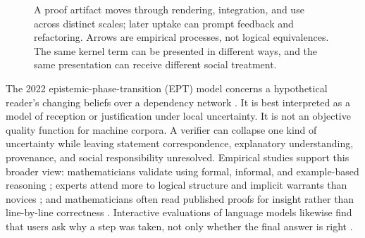 \documentclass[11pt]{article}
\newcommand{\code}[1]{\texttt{#1}}
\begin{document}
\begin{figure}[ht]
\centering
{}
\caption{A proof artifact moves through rendering, integration, and use across distinct scales;
later uptake can prompt feedback and refactoring.  Arrows are empirical processes, not logical
equivalences.  The same kernel term can be presented in different ways, and the same presentation
can receive different social treatment.}
\label{fig:scales}
\end{figure}

The 2022 epistemic-phase-transition (EPT) model concerns a hypothetical reader's changing beliefs
over a dependency network \citep{viteri2022}.  It is best interpreted as a model of reception or
justification under local uncertainty.  It is not an objective quality function for machine
corpora.  A verifier can collapse one kind of uncertainty while leaving statement correspondence,
explanatory understanding, provenance, and social responsibility unresolved.  Empirical studies
support this broader view: mathematicians validate using formal, informal, and example-based
reasoning \citep{weber2008}; experts attend more to logical structure and implicit warrants than
novices \citep{inglis2012,panse2018}; and mathematicians often read published proofs for insight
rather than line-by-line correctness \citep{mejiaramos2014}.  Interactive evaluations of language
models likewise find that users ask why a step was taken, not only whether the final answer is
right \citep{collins2024}.
\end{document}
